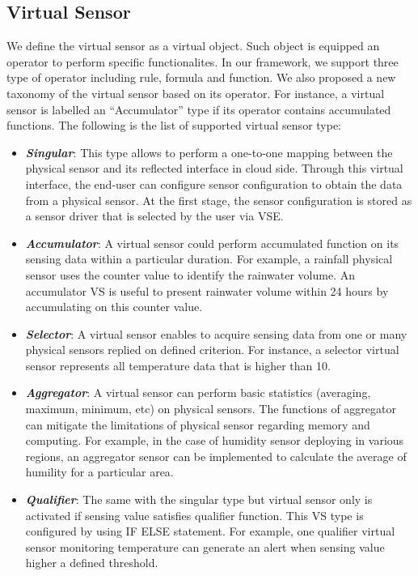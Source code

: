 \subsection{Virtual Sensor}
We define the virtual sensor as a virtual object. Such object is equipped an operator to perform specific functionalites. In our framework, we support three type of operator including rule, formula and function. We also proposed a new taxonomy of the virtual sensor based on its operator. For instance, a virtual sensor is labelled an “Accumulator” type if its operator contains accumulated functions. The following is the list of supported virtual sensor type:
\begin{itemize}
    \item \textbf{\textit{Singular}}: This type allows to perform a one-to-one mapping between the physical sensor and its reflected interface in cloud side. Through this virtual interface, the end-user can configure sensor configuration to obtain the data from a physical sensor. At the first stage, the sensor configuration is stored as a sensor driver that is selected by the user via VSE.
    \item \textbf{\textit{Accumulator}}: A virtual sensor could perform accumulated function on its sensing data within a particular duration. For example, a rainfall physical sensor uses the counter value to identify the rainwater volume. An accumulator VS is useful to present rainwater volume within 24 hours by accumulating on this counter value.
    \item \textbf{\textit{Selector}}: A virtual sensor enables to acquire sensing data from one or many physical sensors replied on defined criterion. For instance, a selector virtual sensor represents all temperature data that is higher than 10.
    \item \textbf{\textit{Aggregator}}: A virtual sensor can perform basic statistics (averaging, maximum, minimum, etc)  on physical sensors. The functions of aggregator can mitigate the limitations of physical sensor regarding memory and computing. For example, in the case of humidity sensor deploying in various regions, an aggregator sensor can be implemented to calculate the average of humility for a particular area.
    \item \textbf{\textit{Qualifier}}: The same with the singular type but virtual sensor only is activated if sensing value satisfies qualifier function. This VS type is configured by using IF ELSE statement. For example, one qualifier virtual sensor monitoring temperature can generate an alert when sensing value higher a defined threshold.

\end{itemize}
